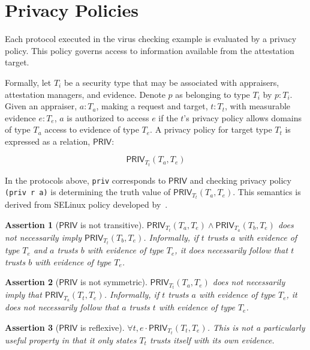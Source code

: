 \documentclass[10pt]{article}
\newtheorem{assertion}{Assertion}
\begin{document}
\section*{Privacy Policies}

Each protocol executed in the virus checking example is evaluated by a
privacy policy.  This policy governs access to information available
from the attestation target.  

Formally, let $T_i$ be a security type that may be associated with
appraisers, attestation managers, and evidence.  Denote $p$ as
belonging to type $T_i$ by $p:T_i$.  Given an appraiser, $a:T_a$,
making a request and target, $t:T_t$, with measurable evidence
$e:T_e$, $a$ is authorized to access $e$ if the $t$'s privacy policy
allows domains of type $T_a$ access to evidence of type $T_e$. A
privacy policy for target type $T_t$ is expressed as a relation,
$\mathsf{PRIV}$:

\[\mathsf{PRIV}_{T_t}(T_a,T_e)\]

In the protocols above, \Verb+priv+ corresponds to $\mathsf{PRIV}$ and
checking privacy policy \Verb+(priv r a)+ is determining the truth
value of $\mathsf{PRIV}_{T_t}(T_a,T_e)$.  This semantics is derived
from SELinux policy developed by~\citet{Hicks:07:A-logical-speci}.

\begin{assertion}[$\mathsf{PRIV}$ is not transitive]
  $\mathsf{PRIV}_{T_t}(T_a,T_e)\wedge\mathsf{PRIV}_{T_a}(T_b,T_e)$
  does not necessarily imply $\mathsf{PRIV}_{T_t}(T_b,T_e)$.
  Informally, if $t$ trusts $a$ with evidence of type $T_e$ and $a$
  trusts $b$ with evidence of type $T_e$, it does necessarily follow
  that $t$ trusts $b$ with evidence of type $T_e$.
\end{assertion}

\begin{assertion}[$\mathsf{PRIV}$ is not symmetric]
  $\mathsf{PRIV}_{T_t}(T_a,T_e)$ does not necessarily imply that
  $\mathsf{PRIV}_{T_a}(T_t,T_e)$.  Informally, if $t$ trusts $a$ with
  evidence of type $T_e$, it does not necessarily follow that $a$
  trusts $t$ with evidence of type $T_e$.
\end{assertion}

\begin{assertion}[$\mathsf{PRIV}$ is reflexive]
  $\forall t,e\cdot\mathsf{PRIV}_{T_t}(T_t,T_e)$. This is not a
  particularly useful property in that it only states $T_t$ trusts
  itself with its own evidence.
\end{assertion}
\end{document}
